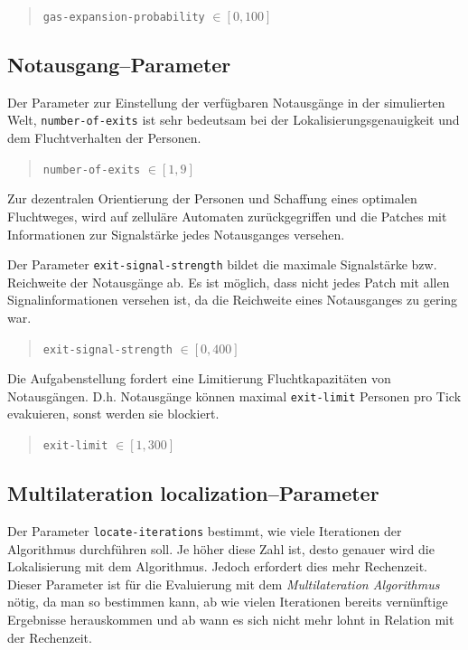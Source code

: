 \begin{quote}
\verb|gas-expansion-probability| $\in [0, 100]$
\end{quote}


\subsection{Notausgang--Parameter}
\label{sec:gui_exit}

Der Parameter zur Einstellung der verfügbaren Notausgänge in der simulierten Welt, 
\verb|number-of-exits| ist sehr bedeutsam bei der Lokalisierungsgenauigkeit und dem Fluchtverhalten der Personen.

\begin{quote}
\verb|number-of-exits| $\in [1, 9]$
\end{quote}

Zur dezentralen Orientierung der Personen und Schaffung eines optimalen Fluchtweges, wird auf zelluläre Automaten zurückgegriffen und die Patches mit Informationen zur Signalstärke jedes Notausganges versehen.\par
Der Parameter \verb|exit-signal-strength| bildet die maximale Signalstärke bzw. Reichweite der Notausgänge ab. Es ist möglich, dass nicht jedes Patch mit allen Signalinformationen versehen ist, da die Reichweite eines Notausganges zu gering war.

\begin{quote}
\verb|exit-signal-strength| $\in [0, 400]$
\end{quote}

Die Aufgabenstellung fordert eine Limitierung Fluchtkapazitäten von Notausgängen. D.h. Notausgänge können maximal \verb|exit-limit| Personen pro Tick evakuieren, sonst werden sie blockiert.

\begin{quote}
\verb|exit-limit| $\in [1, 300]$
\end{quote}

\subsection{Multilateration localization--Parameter}
\label{sec:gui_localization}

Der Parameter \verb|locate-iterations| bestimmt, wie viele Iterationen der Algorithmus durchführen soll. Je höher diese Zahl ist, desto genauer wird die Lokalisierung mit dem Algorithmus. Jedoch erfordert dies mehr Rechenzeit. Dieser Parameter ist für die Evaluierung mit dem  \emph{Multilateration Algorithmus} nötig, da man so bestimmen kann, ab wie vielen Iterationen bereits vernünftige Ergebnisse herauskommen und ab wann es sich nicht mehr lohnt in Relation mit der Rechenzeit.

